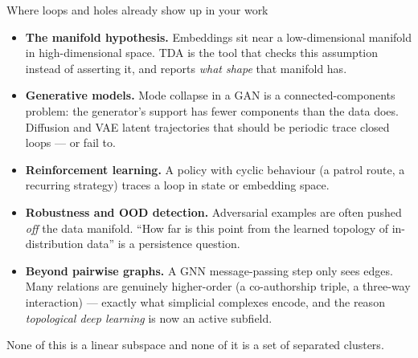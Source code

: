 \documentclass[10pt,aspectratio=169]{beamer}
\begin{document}
    \begin{frame}[shrink=8]{Where loops and holes already show up in your work}
        \small
        \begin{itemize}
            \item \textbf{The manifold hypothesis.} Embeddings sit near a low-dimensional manifold in high-dimensional space.
            TDA is the tool that checks this assumption instead of asserting it, and reports \emph{what shape} that manifold has.
            \item \textbf{Generative models.} Mode collapse in a GAN is a connected-components problem: the generator's support has fewer components than the data does.
            Diffusion and VAE latent trajectories that should be periodic trace closed loops --- or fail to.
            \item \textbf{Reinforcement learning.} A policy with cyclic behaviour (a patrol route, a recurring strategy) traces a loop in state or embedding space.
            \item \textbf{Robustness and OOD detection.} Adversarial examples are often pushed
            \emph{off} the data manifold. ``How far is this point from the learned topology of in-distribution data'' is a persistence question.
            \item \textbf{Beyond pairwise graphs.} A GNN message-passing step only sees edges.
            Many relations are genuinely higher-order (a co-authorship triple, a
            three-way interaction) --- exactly what simplicial complexes encode, and the
            reason \emph{topological deep learning} is now an active subfield.
        \end{itemize}

        \vspace{0.2em}
        \begin{center}
            None of this is a linear subspace and none of it is a set of separated clusters.
        \end{center}
    \end{frame}
\end{document}
